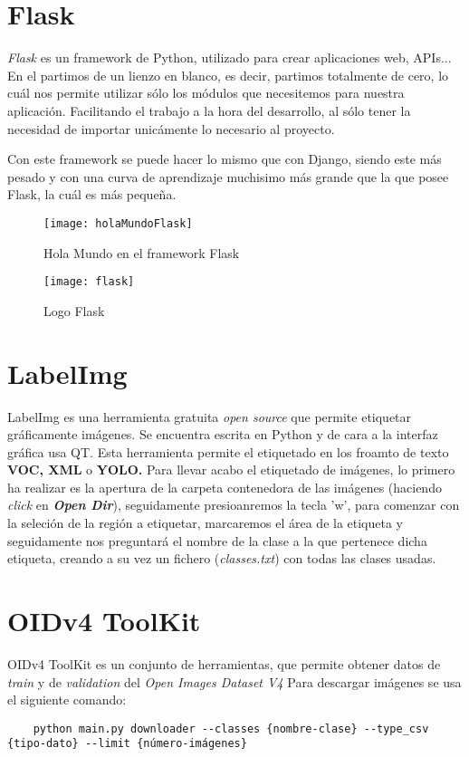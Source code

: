 
\section{Flask}
\textit{Flask} \cite{flask} es un framework de Python, utilizado para crear aplicaciones web, APIs... En el partimos de un lienzo en blanco, es decir, partimos totalmente de cero, lo cuál nos permite utilizar sólo los módulos que necesitemos para nuestra aplicación.
Facilitando el trabajo a la hora del desarrollo, al sólo tener la necesidad de importar unicámente lo necesario al proyecto.

Con este framework se puede hacer lo mismo que con Django, siendo este más pesado y con una curva de aprendizaje muchisimo más grande que la que posee Flask, la cuál es más pequeña.

\begin{figure}[!h]
		\centering
		\texttt{[image: holaMundoFlask]}
		\caption{Hola Mundo en el framework Flask \cite{flask}}\label{fig:holaMundoFlask}
	\end{figure}
\begin{figure}[!h]
		\centering
		\texttt{[image: flask]}
		\caption{Logo Flask \cite{imgFlask}}\label{fig:flask}
\end{figure}

\section{LabelImg}
LabelImg \cite{labelImg} es una herramienta gratuita \textit{open source} que permite etiquetar gráficamente imágenes. Se encuentra escrita en Python y de cara a la interfaz gráfica usa QT.
Esta herramienta permite el etiquetado en los froamto de texto \textbf{VOC, XML} o \textbf{YOLO.}
Para llevar acabo el etiquetado de imágenes, lo primero ha realizar es la apertura de la carpeta contenedora de las imágenes (haciendo \textit{click} en \textbf{\textit{Open Dir}}), seguidamente presioanremos la tecla 'w', para comenzar con la seleción de la región a etiquetar, marcaremos el área de la etiqueta y seguidamente nos preguntará el nombre de la clase a la que pertenece dicha etiqueta, creando a su vez un fichero (\textit{classes.txt}) con todas las clases usadas.


\section{OIDv4 ToolKit}
OIDv4 ToolKit \cite{OIDv4TK} es un conjunto de herramientas, que permite obtener datos de \textit{train} y de \textit{validation} del \textit{Open Images Dataset V4} 
Para descargar imágenes se usa el siguiente comando:
\tiny \begin{verbatim}
    python main.py downloader --classes {nombre-clase} --type_csv {tipo-dato} --limit {número-imágenes}
\end{verbatim} 
\normalsize

